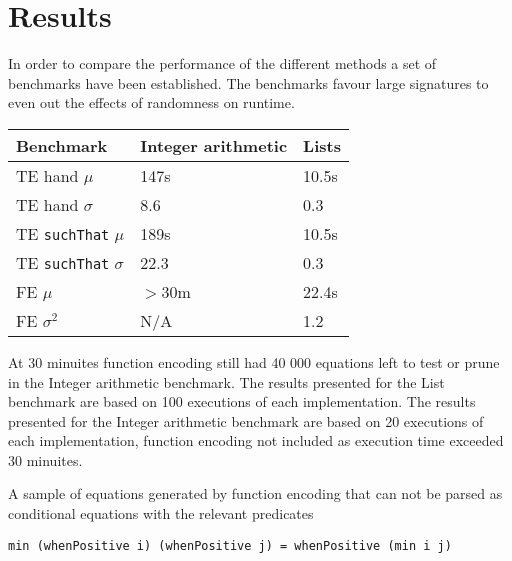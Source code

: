 \section{Results}\label{results}

In order to compare the performance of the different methods
a set of benchmarks have been established. The benchmarks favour
large signatures to even out the effects of randomness on runtime.

\begin{tabular}{|l|l|l|}
    \hline
    Benchmark                       & Integer arithmetic & Lists \\ \hline
    TE hand $\mu$                   & 147s               & 10.5s \\ \hline
    TE hand $\sigma$                & 8.6                & 0.3  \\ \hline
    TE \texttt{suchThat} $\mu$      & 189s               & 10.5s \\ \hline
    TE \texttt{suchThat} $\sigma$   & 22.3               & 0.3  \\ \hline
    FE $\mu$                        & $>$30m             & 22.4s \\ \hline
    FE $\sigma^2$                   & N/A                & 1.2  \\ \hline
\end{tabular}

At 30 minuites function encoding still had
40 000 equations left to test or prune in the Integer arithmetic benchmark.
The results presented for the List benchmark are based on 100 executions
of each implementation.
The results presented for the Integer arithmetic benchmark are based
on 20 executions of each implementation, function encoding not included as execution
time exceeded 30 minuites.

A sample of equations generated by function encoding that can not be parsed as conditional
equations with the relevant predicates
\begin{verbatim}
min (whenPositive i) (whenPositive j) = whenPositive (min i j)
\end{verbatim}
